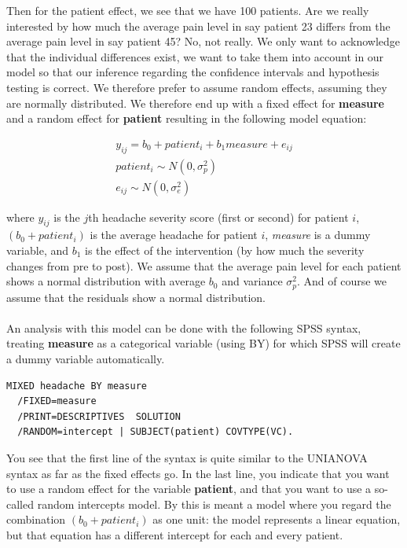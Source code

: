 \documentclass[]{book}\usepackage[]{graphicx}\usepackage[]{color}
\begin{document}
Then for the patient effect, we see that we have 100 patients. Are we really interested by how much the average pain level in say patient 23 differs from the average pain level in say patient 45? No, not really. We only want to acknowledge that the individual differences exist, we want to take them into account in our model so that our inference regarding the confidence intervals and hypothesis testing is correct. We therefore prefer to assume random effects, assuming they are normally distributed. We therefore end up with a fixed effect for \textbf{measure} and a random effect for \textbf{patient} resulting in the following model equation:


\begin{eqnarray}
y_{ij} = b_0 + patient_i + b_1 measure + e_{ij} \\
patient_i \sim N(0, \sigma_p^2)\\
e_{ij} \sim N(0, \sigma_e^2)
\end{eqnarray}

where $y_{ij}$ is the $j$th headache severity score (first or second) for patient $i$, $(b_0 + patient_i)$ is the average headache for patient $i$, \textit{measure} is a dummy variable, and $b_1$ is the effect of the intervention (by how much the severity changes from pre to post). We assume that the average pain level for each patient shows a normal distribution with average $b_0$ and variance $\sigma^2_p$. And of course we assume that the residuals show a normal distribution.
\\
\\
An analysis with this model can be done with the following SPSS syntax, treating \textbf{measure} as a categorical variable (using BY) for which SPSS will create a dummy variable automatically. 


\begin{verbatim}
MIXED headache BY measure
  /FIXED=measure
  /PRINT=DESCRIPTIVES  SOLUTION
  /RANDOM=intercept | SUBJECT(patient) COVTYPE(VC).
\end{verbatim}

You see that the first line of the syntax is quite similar to the UNIANOVA syntax as far as the fixed effects go. In the last line, you indicate that you want to use a random effect for the variable \textbf{patient}, and that you want to use a so-called random intercepts model. By this is meant a model where you regard the combination $(b_0 + patient_i)$ as one unit: the model represents a linear equation, but that equation has a different intercept for each and every patient.  
\end{document}
